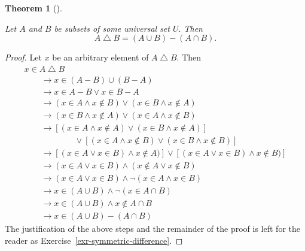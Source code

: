 \documentclass[
  letterpaper,
  10pt,
  reqno,
  twopage,
  openany]{book}
\theoremstyle{plain}
\theoremstyle{definition}
\theoremstyle{definition}
\theoremstyle{definition}
\theoremstyle{plain}
\theoremstyle{plain}
\newtheorem{theorem}{Theorem}[chapter]
\theoremstyle{remark}
\begin{document}
\leavevmode{}%
\begin{theorem}[]\label{thm-symmetric-difference}

Let \(A\) and \(B\) be subsets of some universal set \(U.\) Then
\begin{equation}
\label{symmdiff}
A\bigtriangleup B=(A\cup B)-(A\cap B).
\end{equation}

\end{theorem}

\begin{proof}

Let \(x\) be an arbitrary element of \(A\bigtriangleup B.\) Then
\begin{align*}
& x\in A\bigtriangleup B & \\
& \qquad  \rightarrow x\in (A-B) \cup (B-A) &  \\
& \qquad  \rightarrow x\in A-B \lor x\in B-A &  \\
& \qquad  \rightarrow (x\in A \land x\notin B) \lor (x\in B\land x\notin A) & \\
& \qquad  \rightarrow (x\in B\land x\notin A)  \lor (x\in A \land x\notin B) &  \\
& \qquad  \rightarrow [(x\in A\land x\notin A) \lor (x\in B\land x\notin A)]  \\ 
& \qquad \qquad  \qquad \lor [(x\in A \land x\notin B)\lor (x\in B \land x\notin B)]  \\
& \qquad  \rightarrow [(x\in A \lor x\in B)\land x\notin A)]  \lor [(x\in A \lor x\in B) \land x\notin B)] &  \\
& \qquad  \rightarrow (x\in A \lor x\in B) \land (x \notin A \lor x\notin B) &  \\
& \qquad  \rightarrow (x\in A \lor x\in B) \land \neg (x\in A \land x\in B) &  \\
& \qquad  \rightarrow  x\in (A\cup B) \land \neg (x\in A \cap B) &  \\
& \qquad  \rightarrow  x\in (A\cup B) \land x\notin A\cap B &  \\
& \qquad  \rightarrow  x\in (A\cup B) -(A\cap B) & 
\end{align*} The justification of the above steps and the remainder of
the proof is left for the reader as
Exercise~\ref{exr-symmetric-difference}.

\end{proof}
\end{document}
